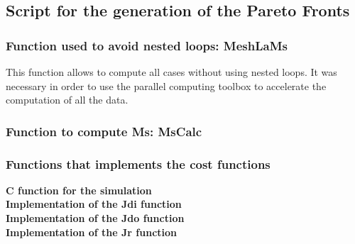 \subsection{Script for the generation of the Pareto Fronts}

\subsubsection{Function used to avoid nested loops: MeshLaMs}
This function allows to compute all cases without using nested loops. It was necessary in order to use the parallel computing toolbox to accelerate the computation of all the data.

\subsubsection{Function to compute Ms: MsCalc}

\subsubsection{Functions that implements the cost functions}
\textbf{C function for the simulation}
\mbox{}\\
\textbf{Implementation of the Jdi function}
\mbox{}\\
\textbf{Implementation of the Jdo function}
\mbox{}\\
\textbf{Implementation of the Jr function}



